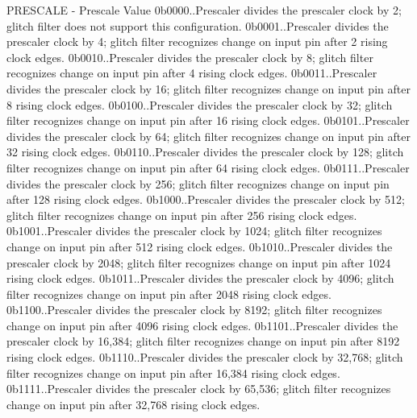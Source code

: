 P\+R\+E\+S\+C\+A\+LE -\/ Prescale Value 0b0000..Prescaler divides the prescaler clock by 2; glitch filter does not support this configuration. 0b0001..Prescaler divides the prescaler clock by 4; glitch filter recognizes change on input pin after 2 rising clock edges. 0b0010..Prescaler divides the prescaler clock by 8; glitch filter recognizes change on input pin after 4 rising clock edges. 0b0011..Prescaler divides the prescaler clock by 16; glitch filter recognizes change on input pin after 8 rising clock edges. 0b0100..Prescaler divides the prescaler clock by 32; glitch filter recognizes change on input pin after 16 rising clock edges. 0b0101..Prescaler divides the prescaler clock by 64; glitch filter recognizes change on input pin after 32 rising clock edges. 0b0110..Prescaler divides the prescaler clock by 128; glitch filter recognizes change on input pin after 64 rising clock edges. 0b0111..Prescaler divides the prescaler clock by 256; glitch filter recognizes change on input pin after 128 rising clock edges. 0b1000..Prescaler divides the prescaler clock by 512; glitch filter recognizes change on input pin after 256 rising clock edges. 0b1001..Prescaler divides the prescaler clock by 1024; glitch filter recognizes change on input pin after 512 rising clock edges. 0b1010..Prescaler divides the prescaler clock by 2048; glitch filter recognizes change on input pin after 1024 rising clock edges. 0b1011..Prescaler divides the prescaler clock by 4096; glitch filter recognizes change on input pin after 2048 rising clock edges. 0b1100..Prescaler divides the prescaler clock by 8192; glitch filter recognizes change on input pin after 4096 rising clock edges. 0b1101..Prescaler divides the prescaler clock by 16,384; glitch filter recognizes change on input pin after 8192 rising clock edges. 0b1110..Prescaler divides the prescaler clock by 32,768; glitch filter recognizes change on input pin after 16,384 rising clock edges. 0b1111..Prescaler divides the prescaler clock by 65,536; glitch filter recognizes change on input pin after 32,768 rising clock edges. 